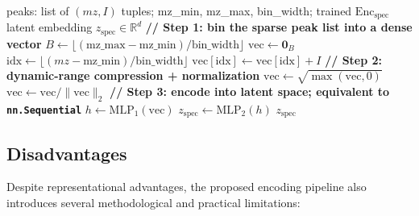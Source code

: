 \begin{algorithm}
    \caption{Spectrum to latent embedding: from (m/z, intensity) tuples to $z_{\mathrm{spec}}$}
    \label{alg:spectrum-to-latent}
    \begin{algorithmic}[1]
        \Require peaks: list of $(mz, I)$ tuples; mz\_min, mz\_max, bin\_width; trained $\mathrm{Enc}_{\mathrm{spec}}$
        \Ensure latent embedding $z_{\mathrm{spec}} \in \mathbb{R}^{d}$
        \Statex
        \State \textbf{// Step 1: bin the sparse peak list into a dense vector}
        \State $B \gets \lfloor (\text{mz\_max} - \text{mz\_min}) / \text{bin\_width} \rfloor$ 
        \State $\text{vec} \gets \mathbf{0}_{B}$
            \State $\text{idx} \gets \lfloor (mz - \text{mz\_min}) / \text{bin\_width} \rfloor$
                \State $\text{vec}[\text{idx}] \gets \text{vec}[\text{idx}] + I$ 
            \EndIf
        \EndFor
        \Statex
        \State \textbf{// Step 2: dynamic-range compression + normalization}
        \State $\text{vec} \gets \sqrt{\max(\text{vec}, 0)}$ 
            \State $\text{vec} \gets \text{vec} / \lVert \text{vec} \rVert_2$ 
        \EndIf
        \Statex
        \State \textbf{// Step 3: encode into latent space; equivalent to \texttt{nn.Sequential}}
        \State $h \gets \text{MLP}_1(\text{vec})$ 
        \State $z_{\mathrm{spec}} \gets \text{MLP}_2(h)$
        \State \Return $z_{\mathrm{spec}}$
    \end{algorithmic}
\end{algorithm}


\subsection{Disadvantages}
\label{sec:disadvantages}
Despite representational advantages, the proposed encoding pipeline also introduces several methodological and practical limitations:

